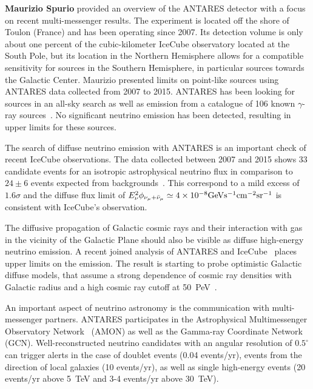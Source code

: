 \documentclass{PoS}
\begin{document}
{\bf Maurizio Spurio} provided an overview of the ANTARES detector with a focus on recent multi-messenger results. The experiment is located off the shore of Toulon (France) and has been operating since 2007. Its detection volume is only about one percent of the cubic-kilometer IceCube observatory located at the South Pole, but its location in the Northern Hemisphere allows for a compatible sensitivity for sources in the Southern Hemisphere, in particular sources towards the Galactic Center. Maurizio presented limits on point-like sources using ANTARES data collected from 2007 to 2015. ANTARES has been looking for sources in an all-sky search as well as emission from a catalogue of 106 known $\gamma$-ray sources~\cite{Albert:2017ohr}. No significant neutrino emission has been detected, resulting in upper limits for these sources.

The search of diffuse neutrino emission with ANTARES is an important check of recent IceCube observations. The data collected between 2007 and 2015 shows 33 candidate events for an isotropic astrophysical neutrino flux in comparison to $24\pm6$ events expected from backgrounds~\cite{Albert:2017nsd}. This correspond to a mild excess of $1.6\sigma$ and the diffuse flux limit of $E_\nu^2\phi_{\nu_\mu+\bar\nu_\mu}\simeq 4\times10^{-8} {\rm GeV} {\rm s}^{-1} {\rm cm}^{-2} {\rm sr}^{-1}$ is consistent with IceCube's observation. 

The diffusive propagation of Galactic cosmic rays and their interaction with gas in the vicinity of the Galactic Plane should also be visible as diffuse high-energy neutrino emission. A recent joined analysis of ANTARES and IceCube~\cite{Albert:2018vxw} places upper limits on the emission. The result is starting to probe optimistic Galactic diffuse models, that assume a strong dependence of cosmic ray densities with Galactic radius and a high cosmic ray cutoff at 50~PeV~\cite{Gaggero:2015xza}.

An important aspect of neutrino astronomy is the communication with multi-messenger partners. ANTARES participates in the Astrophysical Multimessenger Observatory Network~\cite{Smith:2012eu,AMON} (AMON) as well as the Gamma-ray Coordinate Network~\cite{GCN} (GCN). Well-reconstructed neutrino candidates with an angular resolution of $0.5^\circ$ can trigger alerts in the case of doublet events (0.04 events/yr), events from the direction of local galaxies (10 events/yr), as well as single high-energy events (20 events/yr above 5~TeV and 3-4 events/yr above 30~TeV). 
\end{document}
